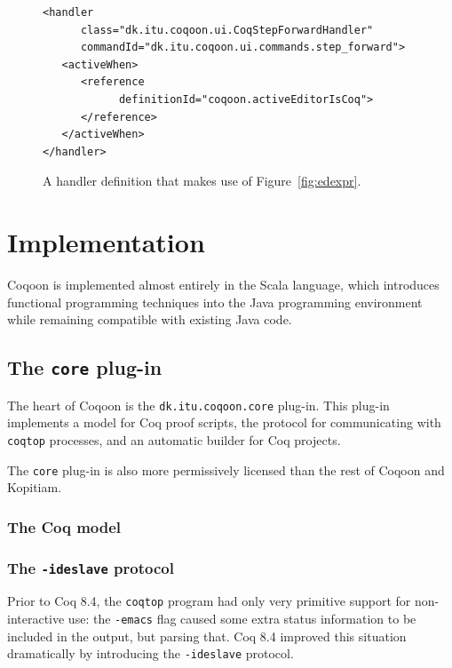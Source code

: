 \documentclass{article}
\begin{document}
\begin{figure}[h]
\begin{lstlisting}[basicstyle=\footnotesize\ttfamily]
<handler
      class="dk.itu.coqoon.ui.CoqStepForwardHandler"
      commandId="dk.itu.coqoon.ui.commands.step_forward">
   <activeWhen>
      <reference
            definitionId="coqoon.activeEditorIsCoq">
      </reference>
   </activeWhen>
</handler>
\end{lstlisting}
\caption{A handler definition that makes use of Figure~\ref{fig:edexpr}.}
\end{figure}

\pagebreak

\section{Implementation}

Coqoon is implemented almost entirely in the Scala language, which introduces
functional programming techniques into the Java programming environment while
remaining compatible with existing Java code.

\subsection{The \texttt{core} plug-in}

The heart of Coqoon is the \texttt{dk.itu.coqoon.core} plug-in. This plug-in
implements a model for Coq proof scripts, the protocol for communicating with
\texttt{coqtop} processes, and an automatic builder for Coq projects.

The \texttt{core} plug-in is also more permissively licensed than the rest of
Coqoon and Kopitiam.

\subsubsection{The Coq model}

\subsubsection{The \texttt{-ideslave} protocol}

Prior to Coq 8.4, the \texttt{coqtop} program had only very primitive support
for non-interactive use: the \texttt{-emacs} flag caused some extra status
information to be included in the output, but parsing that. Coq 8.4 improved this situation
dramatically by introducing the \texttt{-ideslave} protocol.
\end{document}
